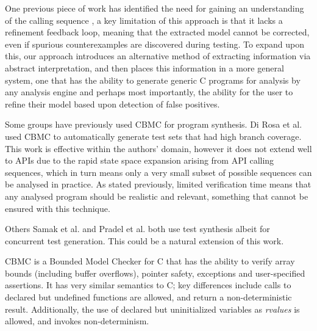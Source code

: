 \documentclass[EPiCempty]{easychair}
\begin{document}
One previous piece of work has identified the need for gaining an understanding of the calling sequence \cite{Acharya2009a}, a key limitation of this approach is that it lacks a refinement feedback loop, meaning that the extracted model cannot be corrected, even if spurious counterexamples are discovered during testing.  To expand upon this,  our approach introduces an alternative method of extracting information via abstract interpretation, and then places this information in a more general system, one that has the ability to generate generic C programs for analysis by any analysis engine and perhaps most importantly, the ability for the user to refine their model based upon detection of false positives.  




Some groups have previously used CBMC \cite{Kroening2014} for program synthesis.  Di Rosa et al.~\cite{VERIFY-2010:Automatic_generation_of_high_quality_test_sets_via_CBMC} used CBMC to automatically generate test sets that had high branch coverage.  This work is effective within the authors' domain, however it does not extend well to APIs due to the rapid state space expansion arising from API calling sequences, which in turn means only a very small subset of possible sequences can be analysed in practice.  As stated previously, limited verification time means that any analysed program should be realistic and relevant, something that cannot be ensured with this technique.


Others Samak et al. \cite{Samak2015} and Pradel et al.  \cite{Pradel2012} both use test synthesis albeit for concurrent test generation.  This could be a natural extension of this work.

CBMC \cite{Kroening2014} is a Bounded Model Checker for C that has the ability to verify array bounds (including buffer overflows), pointer safety, exceptions and user-specified assertions. It has very similar semantics to C;  key differences include calls to declared but undefined functions are allowed, and return a non-deterministic result.  Additionally, the use of declared but uninitialized variables as \textit{rvalues} is allowed, and invokes non-determinism.
\end{document}
